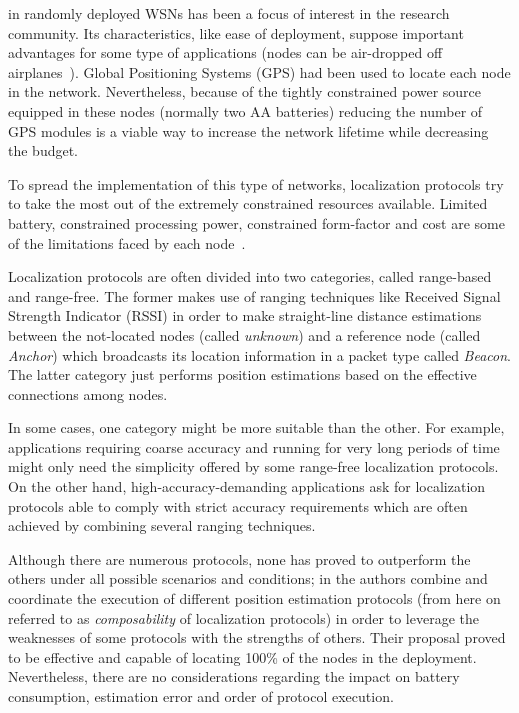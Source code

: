  in randomly deployed WSNs has been a focus of interest in the research community. Its characteristics, like ease of deployment, suppose important advantages for some type of applications (nodes can be air-dropped off airplanes~\cite{airDroppedVolvano}). Global Positioning Systems (GPS) had been used to locate each node in the network. Nevertheless, because of the tightly constrained power source equipped in these nodes (normally two AA batteries) reducing the number of GPS modules is a viable way to increase the network lifetime while decreasing the budget.

To spread the implementation of this type of networks, localization protocols try to take the most out of the extremely constrained resources available. Limited battery, constrained processing power, constrained form-factor and cost are some of the limitations faced by each node~\cite{AkyildizWSNs}.

Localization protocols are often divided into two categories, called range-based and range-free. The former makes use of ranging techniques like Received Signal Strength Indicator (RSSI) in order to make straight-line distance estimations between the not-located nodes (called \emph{unknown}) and a reference node (called \emph{Anchor}) which broadcasts its location information in a packet type called \emph{Beacon}. The latter category just performs position estimations based on the effective connections among nodes. 

In some cases, one category might be more suitable than the other. For example, applications requiring coarse accuracy and running for very long periods of time might only need the simplicity offered by some range-free localization protocols. On the other hand, high-accuracy-demanding applications ask for localization protocols able to comply with strict accuracy requirements which are often achieved by combining several ranging techniques.

Although there are numerous protocols, none has proved to outperform the others under all possible scenarios and conditions; in \cite{composability} the authors combine and coordinate the execution of different position estimation protocols (from here on referred to as \emph{composability} of localization protocols) in order to leverage the weaknesses of some protocols with the strengths of others. Their proposal proved to be effective and capable of locating 100\% of the nodes in the deployment. Nevertheless, there are no considerations regarding the impact on battery consumption, estimation error and order of protocol execution.

